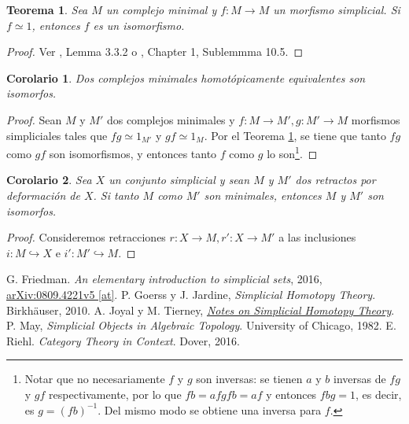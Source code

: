 \documentclass[11pt]{report}
\theoremstyle{colored}
\newtheorem{theorem}{Teorema}[section]
\newtheorem{corollary}{Corolario}[section]
\begin{document}
\begin{theorem} \label{hom-iso-min} Sea $M$ un complejo minimal y $f : M \to M$ un morfismo simplicial. Si $f \simeq 1$, entonces $f$ es un isomorfismo.
\end{theorem}
\begin{proof} Ver \cite{JT}, Lemma 3.3.2 o \cite{GJ},  Chapter 1, Sublemmma 10.5.
\end{proof}

\begin{corollary} Dos complejos minimales homotópicamente equivalentes son isomorfos.
\end{corollary}
\begin{proof} Sean $M$ y $M'$ dos complejos minimales y $f : M \to M', g: M' \to M$ morfismos simpliciales tales que $fg \simeq 1_{M'}$ y $gf \simeq 1_{M}$. Por el Teorema \ref{hom-iso-min}, se tiene que tanto $fg$ como $gf$ son isomorfismos, y entonces tanto $f$ como $g$ lo son\footnote{Notar que no necesariamente $f$ y $g$ son inversas: se tienen $a$ y $b$ inversas de $fg$ y $gf$ respectivamente, por lo que $fb = afgfb = af$ y entonces $fbg = 1$, es decir, es $g = (fb)^{-1}$. Del mismo modo se obtiene una inversa para $f$.}.
\end{proof}

\begin{corollary} Sea $X$ un conjunto simplicial y sean $M$ y $M'$ dos retractos por deformación de $X$. Si tanto $M$ como $M'$ son minimales, entonces $M$ y $M'$ son isomorfos.
\end{corollary}
\begin{proof} Consideremos retracciones $r : X \to M, r' : X \to M'$ a las inclusiones $i : M \hookrightarrow X$ e $i' : M' \hookrightarrow M$. 
\end{proof}

\begin{thebibliography}{}
 G. Friedman. \textit{An elementary introduction to simplicial sets}, 2016, \href{https://arxiv.org/abs/0809.4221}{arXiv:0809.4221v5 [at]}.
 P. Goerss y J. Jardine, \textit{Simplicial Homotopy Theory}. Birkhäuser, 2010.
 A. Joyal y M. Tierney, \href{http://www.mat.uab.cat/~kock/crm/hocat/advanced-course/Quadern47.pdf}{\textit{Notes on Simplicial Homotopy Theory}}.
 P. May, \textit{Simplicial Objects in Algebraic Topology}. University of Chicago, 1982. 
 E. Riehl. \textit{Category Theory in Context}. Dover, 2016.
\end{thebibliography}
\end{document}
